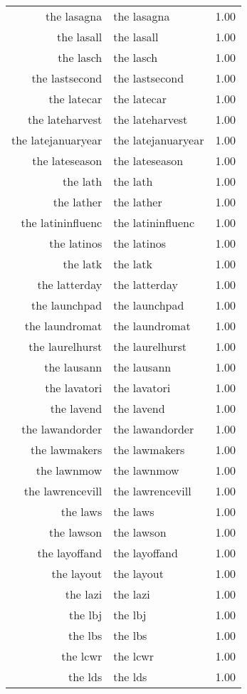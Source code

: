 \begin{table}[ht]
\begin{tabular}{rlr}
  the lasagna & the lasagna & 1.00 \\ 
  the lasall & the lasall & 1.00 \\ 
  the lasch & the lasch & 1.00 \\ 
  the lastsecond & the lastsecond & 1.00 \\ 
  the latecar & the latecar & 1.00 \\ 
  the lateharvest & the lateharvest & 1.00 \\ 
  the latejanuaryear & the latejanuaryear & 1.00 \\ 
  the lateseason & the lateseason & 1.00 \\ 
  the lath & the lath & 1.00 \\ 
  the lather & the lather & 1.00 \\ 
  the latininfluenc & the latininfluenc & 1.00 \\ 
  the latinos & the latinos & 1.00 \\ 
  the latk & the latk & 1.00 \\ 
  the latterday & the latterday & 1.00 \\ 
  the launchpad & the launchpad & 1.00 \\ 
  the laundromat & the laundromat & 1.00 \\ 
  the laurelhurst & the laurelhurst & 1.00 \\ 
  the lausann & the lausann & 1.00 \\ 
  the lavatori & the lavatori & 1.00 \\ 
  the lavend & the lavend & 1.00 \\ 
  the lawandorder & the lawandorder & 1.00 \\ 
  the lawmakers & the lawmakers & 1.00 \\ 
  the lawnmow & the lawnmow & 1.00 \\ 
  the lawrencevill & the lawrencevill & 1.00 \\ 
  the laws & the laws & 1.00 \\ 
  the lawson & the lawson & 1.00 \\ 
  the layoffand & the layoffand & 1.00 \\ 
  the layout & the layout & 1.00 \\ 
  the lazi & the lazi & 1.00 \\ 
  the lbj & the lbj & 1.00 \\ 
  the lbs & the lbs & 1.00 \\ 
  the lcwr & the lcwr & 1.00 \\ 
  the lds & the lds & 1.00 \\ 

\end{tabular}
\end{table}
